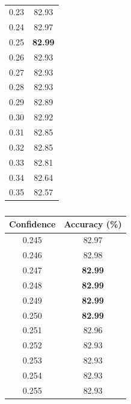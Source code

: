 \documentclass[12pt]{article}
\begin{document}
\begin{table}[H]
\begin{subtable}{.32\linewidth}
\begin{tabular}{c|c}
              0.23  & 82.93 \\
              0.24  & 82.97 \\
              0.25  & \textbf{82.99} \\
              0.26  & 82.93 \\
              0.27  & 82.93 \\
              0.28  & 82.93 \\
              0.29  & 82.89 \\
              0.30  & 82.92 \\
              0.31  & 82.85 \\
              0.32  & 82.85 \\
              0.33  & 82.81 \\
              0.34  & 82.64 \\
              0.35  & 82.57 \\
              \bottomrule
            \end{tabular}
            \label{tab:dt-con-b}
          \end{subtable}
          \begin{subtable}{.32\linewidth}
            \centering
            \caption{}
            \begin{tabular}{c|c}
              \toprule
              \multicolumn{1}{l|}{Confidence} & \multicolumn{1}{l}{Accuracy (\%)} \\
              \midrule
              0.245 & 82.97 \\
              0.246 & 82.98 \\
              0.247 & \textbf{82.99} \\
              0.248 & \textbf{82.99} \\
              0.249 & \textbf{82.99} \\
              0.250 & \textbf{82.99} \\
              0.251 & 82.96 \\
              0.252 & 82.93 \\
              0.253 & 82.93 \\
              0.254 & 82.93 \\
              0.255 & 82.93 \\
              \bottomrule
            \end{tabular}
          \label{tab:dt-con-c}
          \end{subtable}
        \label{tab:dt-con}
      \end{table}
      \doublespacing
\end{document}

